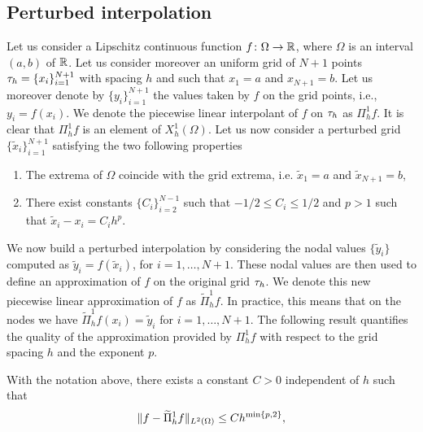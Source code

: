 \documentclass[10pt]{article}
\begin{document}
\subsection{Perturbed interpolation} Let us consider a Lipschitz continuous function $f\colon\Omega\to\mathbb{R}$, where $\Omega$ is an interval $(a, b)$ of $\mathbb{R}$. Let us consider moreover an uniform grid of $N+1$ points $\tau_h = \{x_i\}_{i=1}^{N+1}$ with spacing $h$ and such that $x_1 = a$ and $x_{N+1} = b$. Let us moreover denote by $\{y_i\}_{i=1}^{N+1}$ the values taken by $f$ on the grid points, i.e., $y_i = f(x_i)$. We denote the piecewise linear interpolant of $f$ on $\tau_h$  as $\Pi^1_h f$. It is clear that $\Pi^1_h f$ is an element of $X_h^1(\Omega)$. Let us now consider a perturbed grid $\{\tilde x_i\}_{i=1}^{N+1}$ satisfying the two following properties
\begin{enumerate}
	\item The extrema of $\Omega$ coincide with the grid extrema, i.e. $\tilde x_1 = a$ and $\tilde x_{N+1} = b$,
	\item There exist constants $\{C_i\}_{i=2}^{N-1}$ such that $-1/2 \leq C_i \leq 1/2$ and $p > 1$ such that $\tilde x_i - x_i = C_ih^p$.
\end{enumerate}
We now build a perturbed interpolation by considering the nodal values $\{\tilde y_i\}$ computed as $\tilde y_i = f(\tilde x_i)$, for $i = 1,\ldots, N+1$. These nodal values are then used to define an approximation of $f$ on the original grid $\tau_h$. We denote this new piecewise linear approximation of $f$ as $\widetilde \Pi_h^1 f$. In practice, this means that on the nodes we have $\widetilde \Pi_h^1 f(x_i) = \tilde y_i$ for $i = 1, \ldots, N+1$. The following result quantifies the quality of the approximation provided by $\Pi_h^1 f$ with respect to the grid spacing $h$ and the exponent $p$.
\begin{lemma}\label{lem:Interp1D} With the notation above, there exists a constant $C > 0$ independent of $h$ such that
\begin{equation}
	\lVert f - \widetilde \Pi_h^1f\rVert_{L^2(\Omega)} \leq C h^{\min\{p,2\}},
\end{equation}
\end{lemma}
\end{document}
